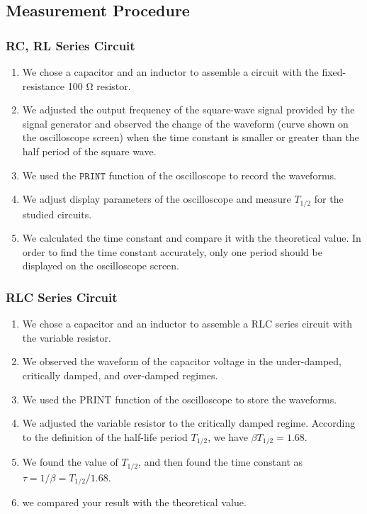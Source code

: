 \documentclass[a4paper]{article}
\begin{document}
\subsection{Measurement Procedure}

\subsubsection{RC, RL Series Circuit}

\begin{enumerate}
	\item We chose a capacitor and an inductor to assemble a circuit with the fixed-resistance 100 Ω resistor.
	\item We adjusted the output frequency of the square-wave signal provided by the signal generator and observed the change of the waveform (curve shown on the oscilloscope screen) when the time constant is smaller or greater than the half period of the square wave.
	\item We used the $\texttt{PRINT}$ function of the oscilloscope to record the waveforms.
	\item We adjust display parameters of the oscilloscope and measure $T_{1/2}$ for the studied circuits.
	\item We calculated the time constant and compare it with the theoretical value. In order to find the time constant accurately, only one period should be displayed on the oscilloscope screen.
\end{enumerate}

\subsubsection{RLC Series Circuit}

\begin{enumerate}
	\item We chose a capacitor and an inductor to assemble a RLC series circuit with the variable resistor.
	\item We observed the waveform of the capacitor voltage in the under-damped, critically damped, and over-damped regimes.
	\item We used the PRINT function of the oscilloscope to store the waveforms.
	\item We adjusted the variable resistor to the critically damped regime. According to the definition of the half-life period $ T_{1/2} $, we have $ \beta T_{1/2} = 1.68 $.
	\item We found the value of $ T_{1/2} $, and then found the time constant as $ \tau = 1/\beta = T_{1/2}/1.68 $.
	\item we compared your result with the theoretical value.
\end{enumerate}
\end{document}
